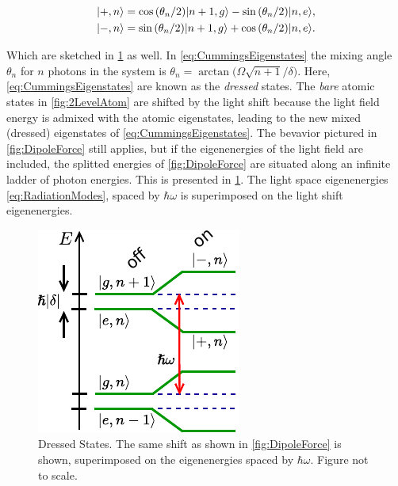 \begin{subequations}\label{eq:CummingsEigenstates}
    \begin{align}
        \lvert+,n\rangle &= \cos{({\theta_n}/2)} \lvert n+1,g\rangle -\sin{(\theta_n/2)} \lvert n,e\rangle, \\
        \lvert-,n\rangle &= \sin{(\theta_n/2)}\lvert n+1,g\rangle + \cos{(\theta_n/2)} \lvert n,e\rangle.
    \end{align}
\end{subequations}

Which are sketched in \cref{fig:DressedStatePicture} as well. 
In \cref{eq:CummingsEigenstates} the mixing angle $\theta_n$ for $n$ photons in the system is $\theta_n = \arctan{(\Omega\sqrt{n+1} / \delta})$.
Here, \cref{eq:CummingsEigenstates} are known as the \emph{dressed} states.
The \emph{bare} atomic states in \cref{fig:2LevelAtom} are shifted by the light shift because the light field energy is admixed with the atomic eigenstates, leading to the new mixed (dressed) eigenstates of \cref{eq:CummingsEigenstates}. 
The bevavior pictured in \cref{fig:DipoleForce} still applies, but if the eigenenergies of the light field are included, the splitted energies of \cref{fig:DipoleForce} are situated along an infinite ladder of photon energies. 
This is presented in \cref{fig:DressedStatePicture}. 
The light space eigenenergies \cref{eq:RadiationModes}, spaced by $\hbar \omega$ is superimposed on the light shift eigenenergies. 

\begin{figure}
    \centering
    \includegraphics[width=0.4\linewidth]{figures/DressedStates.pdf}
    \caption{Dressed States. The same shift as shown in \cref{fig:DipoleForce} is shown, superimposed on the  eigenenergies spaced by $\hbar \omega$. 
    Figure not to scale. }
    \label{fig:DressedStatePicture}
\end{figure}
